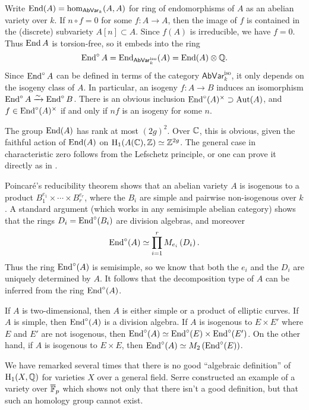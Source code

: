 \documentclass{article}
\begin{document}
Write $\operatorname{End}(A)=\hom_{\mathsf{AbVar}_k}(A,A)$ for ring of endomorphisms of $A$ 
as an abelian variety over $k$. If $n\circ f=0$ for some $f:A\to A$, then the 
image of $f$ is contained in the (discrete) subvariety $A[n]\subset A$. Since 
$f(A)$ is irreducible, we have $f=0$. Thus $\operatorname{End} A$ is torsion-free, so it 
embeds into the ring
\[
  \operatorname{End}^\circ A = \operatorname{End}_{\mathsf{AbVar}_k^\mathrm{iso}}(A) = \operatorname{End}(A)\otimes\mathbb{Q} \text{.}
\]
Since $\operatorname{End}^\circ A$ can be defined in terms of the category 
$\mathsf{AbVar}_{k}^\mathrm{iso}$, it only depends on the isogeny class of 
$A$. In particular, an isogeny $f:A\to B$ induces an isomorphism 
$\operatorname{End}^\circ A\xrightarrow\sim \operatorname{End}^\circ B$. 
There is an obvious inclusion $\operatorname{End}^\circ(A)^\times\supset\operatorname{Aut}(A)$, and  
$f\in \operatorname{End}^\circ(A)^\times$ if and only if $n f$ is an isogeny for some $n$.

The group $\operatorname{End}(A)$ has rank at most $(2 g)^2$. Over $\mathbb{C}$, this is obvious, 
given the faithful action of $\operatorname{End}(A)$ on $\operatorname{H}_1(A(\mathbb{C}),\mathbb{Z})\simeq \mathbb{Z}^{2g}$. 
The general case in characteristic zero follows from the Lefschetz principle, 
or one can prove it directly as in \cite[IV.18.3]{mu08}. 

Poincar\'e's reducibility theorem shows that an abelian variety $A$ is 
isogenous to a product $B_1^{e_1}\times \cdots \times B_r^{e_r}$, where the 
$B_i$ are simple and pairwise non-isogenous over $k$. A standard argument 
(which works in any semisimple abelian category) shows that the rings 
$D_i=\operatorname{End}^\circ(B_i)$ are division algebras, and moreover 
\[
  \operatorname{End}^\circ(A) \simeq \prod_{i=1}^r M_{e_i}\left(D_i\right) \text{.}
\]
Thus the ring $\operatorname{End}^\circ(A)$ is semisimple, so we know that both the $e_i$ and 
the $D_i$ are uniquely determined by $A$. It follows that the decomposition 
type of $A$ can be inferred from the ring $\operatorname{End}^\circ(A)$. 

\begin{example}
If $A$ is two-dimensional, then $A$ is either simple or a product of elliptic 
curves. If $A$ is simple, then $\operatorname{End}^\circ(A)$ is a division algebra. If $A$ 
is isogenous to $E\times E'$ where $E$ and $E'$ are not isogenous, then 
$\operatorname{End}^\circ(A)\simeq \operatorname{End}^\circ(E)\times \operatorname{End}^\circ(E')$. On the other hand, if 
$A$ is isogenous to $E\times E$, then 
$\operatorname{End}^\circ(A)\simeq M_2\left(\operatorname{End}^\circ(E)\right)$. 
\end{example}

We have remarked several times that there is no good ``algebraic definition'' 
of $\operatorname{H}_1(X,\mathbb{Q})$ for varieties $X$ over a general field. Serre constructed an 
example of a variety over $\overline{\mathbb{F}}_p$ which shows not only that there 
isn't a good definition, but that such an homology group cannot exist. 
\end{document}
